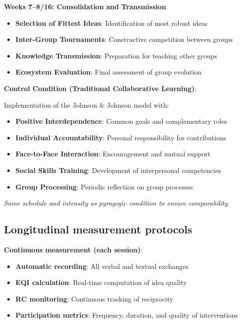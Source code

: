 \textbf{Weeks 7--8/16: Consolidation and Transmission}
\begin{itemize}
    \item \textbf{Selection of Fittest Ideas}: Identification of most robust ideas
    \item \textbf{Inter-Group Tournaments}: Constructive competition between groups
    \item \textbf{Knowledge Transmission}: Preparation for teaching other groups
    \item \textbf{Ecosystem Evaluation}: Final assessment of group evolution
\end{itemize}

\textbf{Control Condition (Traditional Collaborative Learning)}:

Implementation of the Johnson \& Johnson model \cite{Johnson1999} with:
\begin{itemize}
    \item \textbf{Positive Interdependence}: Common goals and complementary roles
    \item \textbf{Individual Accountability}: Personal responsibility for contributions
    \item \textbf{Face-to-Face Interaction}: Encouragement and mutual support
    \item \textbf{Social Skills Training}: Development of interpersonal competencies
    \item \textbf{Group Processing}: Periodic reflection on group processes
\end{itemize}

\emph{Same schedule and intensity as pyragogic condition to ensure comparability.}

\subsection{Longitudinal measurement protocols}

\textbf{Continuous measurement (each session)}:
\begin{itemize}
    \item \textbf{Automatic recording}: All verbal and textual exchanges
    \item \textbf{EQI calculation}: Real-time computation of idea quality
    \item \textbf{RC monitoring}: Continuous tracking of reciprocity
    \item \textbf{Participation metrics}: Frequency, duration, and quality of interventions
\end{itemize}


